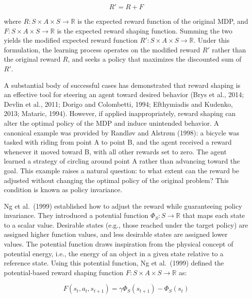 \begin{equation}
R' = R + F \label{eq:shaping-general}
\end{equation}

where $R: S \times A \times S \rightarrow \mathbb{R}$ is the expected reward function of the original MDP, and $F: S \times A \times S \rightarrow \mathbb{R}$ is the expected reward shaping function. Summing the two yields the modified expected reward function $R': S \times A \times S \rightarrow \mathbb{R}$. Under this formulation, the learning process operates on the modified reward $R'$ rather than the original reward $R$, and seeks a policy that maximizes the discounted sum of $R'$.

A substantial body of successful cases has demonstrated that reward shaping is an effective tool for steering an agent toward desired behavior (Brys et al., 2014; Devlin et al., 2011; Dorigo and Colombetti, 1994; Efthymiadis and Kudenko, 2013; Mataric, 1994). However, if applied inappropriately, reward shaping can alter the optimal policy of the MDP and induce unintended behavior. A canonical example was provided by Randl\o{}v and Alstr\o{}m (1998): a bicycle was tasked with riding from point A to point B, and the agent received a reward whenever it moved toward B, with all other rewards set to zero. The agent learned a strategy of circling around point A rather than advancing toward the goal. This example raises a natural question: to what extent can the reward be adjusted without changing the optimal policy of the original problem? This condition is known as policy invariance.

Ng et al.\ (1999) established how to adjust the reward while guaranteeing policy invariance. They introduced a potential function $\Phi_S: S \rightarrow \mathbb{R}$ that maps each state to a scalar value. Desirable states (e.g., those reached under the target policy) are assigned higher function values, and less desirable states are assigned lower values. The potential function draws inspiration from the physical concept of potential energy, i.e., the energy of an object in a given state relative to a reference state. Using this potential function, Ng et al.\ (1999) defined the potential-based reward shaping function $F: S \times A \times S \rightarrow \mathbb{R}$ as:

\begin{equation}
F(s_t, a_t, s_{t+1}) = \gamma \Phi_S(s_{t+1}) - \Phi_S(s_t) \label{eq:ng-shaping}
\end{equation}

